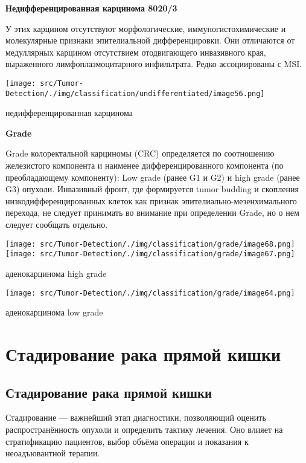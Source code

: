 \documentclass[
  russian,
  12pt,
  a4paper,
]{report}
\begin{document}
\textbf{Недифференцированная карцинома 8020/3}

У этих карцином отсутствуют морфологические, иммуногистохимические и
молекулярные признаки эпителиальной дифференцировки. Они отличаются от
медуллярных карцином отсутствием отодвигающего инвазивного края,
выраженного лимфоплазмоцитарного инфильтрата. Редко ассоциированы с MSI.

\texttt{[image: src/Tumor-Detection/./img/classification/undifferentiated/image56.png]}

недифференцированная карцинома

\textbf{Grade}

Grade колоректальной карциномы (CRC) определяется по соотношению
железистого компонента и наименее дифференцированного компонента (по
преобладающему компоненту): Low grade (ранее G1 и G2) и high grade
(ранее G3) опухоли. Инвазивный фронт, где формируется tumor budding и
скопления низкодифференцированных клеток как признак
эпителиально-мезенхимального перехода, не следует принимать во внимание
при определении Grade, но о нем следует сообщать отдельно.

\texttt{[image: src/Tumor-Detection/./img/classification/grade/image68.png]}
\texttt{[image: src/Tumor-Detection/./img/classification/grade/image67.png]}

аденокарцинома high grade

\texttt{[image: src/Tumor-Detection/./img/classification/grade/image64.png]}

аденокарцинома low grade

\part{Стадирование рака прямой кишки}

\chapter{Стадирование рака прямой
кишки}\label{ux441ux442ux430ux434ux438ux440ux43eux432ux430ux43dux438ux435-ux440ux430ux43aux430-ux43fux440ux44fux43cux43eux439-ux43aux438ux448ux43aux438-1}

Стадирование --- важнейший этап диагностики, позволяющий оценить
распространённость опухоли и определить тактику лечения. Оно влияет на
стратификацию пациентов, выбор объёма операции и показания к
неоадъювантной терапии.
\end{document}
